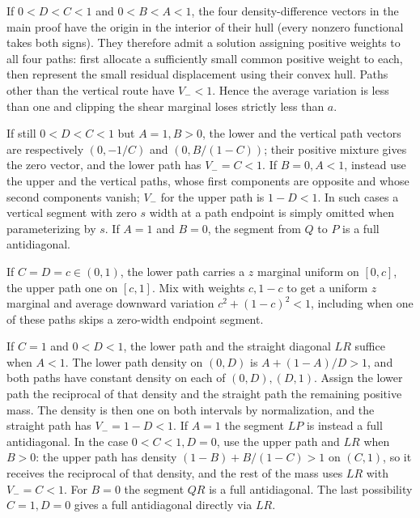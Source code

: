 \documentclass[
  10pt,
]{article}
\begin{document}
If \(0<D<C<1\) and \(0<B<A<1\), the four density-difference vectors in
the main proof have the origin in the interior of their hull (every
nonzero functional takes both signs). They therefore admit a solution
assigning positive weights to all four paths: first allocate a
sufficiently small common positive weight to each, then represent the
small residual displacement using their convex hull. Paths other than
the vertical route have \(V_-<1\). Hence the average variation is less
than one and clipping the shear marginal loses strictly less than \(a\).

If still \(0<D<C<1\) but \(A=1,B>0\), the lower and the vertical path
vectors are respectively \((0,-1/C)\) and \((0,B/(1-C))\); their
positive mixture gives the zero vector, and the lower path has
\(V_-=C<1\). If \(B=0,A<1\), instead use the upper and the vertical
paths, whose first components are opposite and whose second components
vanish; \(V_-\) for the upper path is \(1-D<1\). In such cases a
vertical segment with zero \(s\) width at a path endpoint is simply
omitted when parameterizing by \(s\). If \(A=1\) and \(B=0\), the
segment from \(Q\) to \(P\) is a full antidiagonal.

If \(C=D=c\in(0,1)\), the lower path carries a \(z\) marginal uniform on
\([0,c]\), the upper path one on \([c,1]\). Mix with weights \(c,1-c\)
to get a uniform \(z\) marginal and average downward variation
\(c^2+(1-c)^2<1\), including when one of these paths skips a zero-width
endpoint segment.

If \(C=1\) and \(0<D<1\), the lower path and the straight diagonal
\(LR\) suffice when \(A<1\). The lower path density on \((0,D)\) is
\(A+(1-A)/D>1\), and both paths have constant density on each of
\((0,D),(D,1)\). Assign the lower path the reciprocal of that density
and the straight path the remaining positive mass. The density is then
one on both intervals by normalization, and the straight path has
\(V_-=1-D<1\). If \(A=1\) the segment \(LP\) is instead a full
antidiagonal. In the case \(0<C<1,D=0\), use the upper path and \(LR\)
when \(B>0\): the upper path has density \((1-B)+B/(1-C)>1\) on
\((C,1)\), so it receives the reciprocal of that density, and the rest
of the mass uses \(LR\) with \(V_-=C<1\). For \(B=0\) the segment \(QR\)
is a full antidiagonal. The last possibility \(C=1,D=0\) gives a full
antidiagonal directly via \(LR\).
\end{document}
